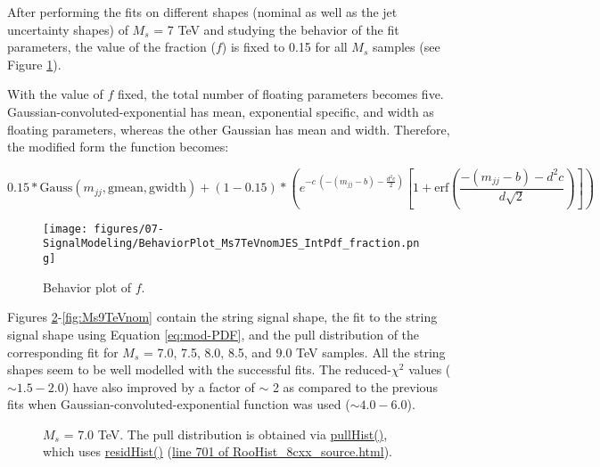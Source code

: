 After performing the fits on different shapes (nominal as well as the jet uncertainty shapes) of $M_{s}$ = 7 TeV and studying the behavior of the fit parameters, the value of the fraction ($f$) is fixed to 0.15 for all $M_{s}$ samples (see Figure \ref{fig:fracBehavior}).

With the value of $f$ fixed, the total number of floating parameters becomes five. Gaussian-convoluted-exponential has mean, exponential specific, and width as floating parameters, whereas the other Gaussian has mean and width. Therefore, the modified form the function becomes:

\begin{equation}
 0.15*\text{Gauss}(m_{jj}, \text{gmean}, \text{gwidth}) + (1-0.15) * (e^{-c~(-(m_{jj}-b)-\frac{d^{2}c}{2})}[1+\mathrm{erf}(\frac{-(m_{jj}-b)-d^{2}c}{d\sqrt{2}})])
\label{eq:mod-PDF}
\end{equation}

\pagebreak

\begin{figure}[!htb]
 \centering
\texttt{[image: figures/07-SignalModeling/BehaviorPlot\_Ms7TeVnomJES\_IntPdf\_fraction.png]}
\caption{Behavior plot of $f$.}  
\label{fig:fracBehavior}
\end{figure}  

\vspace{50pt}
Figures \ref{fig:Ms7TeVnom}-\ref{fig:Ms9TeVnom} contain the string signal shape, the fit to the string signal shape using Equation \ref{eq:mod-PDF}, and the pull 
distribution of the corresponding fit for $M_{s}$ = 7.0, 7.5, 8.0, 8.5, and 9.0 TeV samples. All the string shapes seem to be well modelled with the successful 
fits. The reduced-$\chi^2$ values ($\sim 1.5-2.0$) have also improved by a factor of $\sim$ 2 as compared to the previous fits when Gaussian-convoluted-exponential function was used ($\sim 4.0-6.0$).

\pagebreak

\begin{figure}[!htb]
  \centering
  \vspace{2pt}	
  \caption{$M_{s}$ = 7.0 TeV. The pull distribution is obtained via \href{https://root.cern.ch/doc/master/classRooPlot.html\#aed57408d2abd31d2a00619bf26bb5539}{pullHist()}, which uses \href{https://root.cern.ch/doc/master/classRooPlot.html\#a155077d893bbff4ee72495cce69195e6}{residHist()} (\href{https://root.cern.ch/doc/v608/RooHist_8cxx_source.html}{line 701 of RooHist\_8cxx\_source.html}).}
  \label{fig:Ms7TeVnom}
\end{figure}
 

